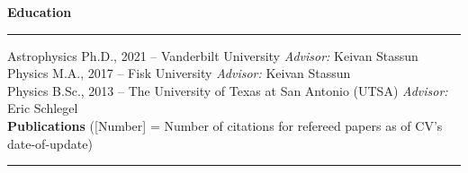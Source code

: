 \documentclass[letter,11pt]{article}
\begin{document}

\noindent
{\bf Education} \\
\vspace{-10mm}
\begin{center}
\rule{\textwidth}{0.2mm}
\end{center}
\vspace{-3mm}
\noindent
Astrophysics Ph.D., 2021 -- Vanderbilt University \hfill \textit{Advisor:} Keivan Stassun \\
Physics M.A., 2017 -- Fisk University \hfill \enspace \qquad \textit{Advisor:} Keivan Stassun \\
Physics B.Sc., 2013 -- The University of Texas at San Antonio (UTSA) \hfill \textit{Advisor:} Eric Schlegel \\

\noindent
{\bf Publications} ([Number] = Number of citations for refereed papers as of CV's date-of-update) \\
\vspace{-10mm}
\begin{center}
\rule{\textwidth}{0.2mm}
\end{center}
\vspace{-3mm}
\noindent
\end{document}
